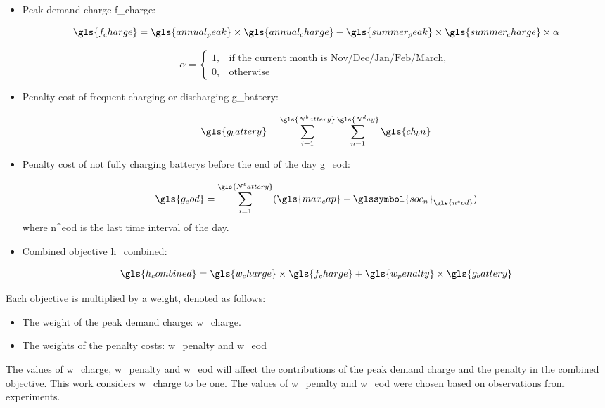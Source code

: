 \begin{itemize}
	\item Peak demand charge \gls{f_charge}: 
	
	\begin{equation}
		\gls{f_charge} =  \gls{annual_peak} \times \gls{annual_charge} + \gls{summer_peak} \times \gls{summer_charge} \times \alpha
	\end{equation}
	
	\begin{equation}
		\alpha = 
		\begin{cases}
			1,				& \text{if the current month is Nov/Dec/Jan/Feb/March, } \\
			0,              & \text{otherwise}
		\end{cases}
	\end{equation}
	
	
	\item Penalty cost of frequent charging or discharging \gls{g_battery}:
	
	\begin{equation}
		\gls{g_battery} = \sum_{i=1}^{\gls{N^battery}}\sum_{n=1}^{\gls{N^day}} \gls{ch_bn} 
	\end{equation}
	
	\item Penalty cost of not fully charging \glspl{battery} before the end of the day \gls{g_eod}:
	
	\begin{equation}
		\gls{g_eod} = \sum_{i=1}^{\gls{N^battery}} ( \gls{max_cap} -  \glssymbol{soc_n}_{ \gls{n^eod}  })
	\end{equation}
	where  \gls{n^eod} is the last time interval of the day. 
	
	\item Combined objective \gls{h_combined}:
	
	\begin{equation}
		\gls{h_combined} = \gls{w_charge} \times \gls{f_charge} + \gls{w_penalty} \times \gls{g_battery}
	\end{equation}
	
\end{itemize}

Each objective is multiplied by a weight, denoted as follows:

\begin{itemize}
	\item The weight of the peak demand charge: \gls{w_charge}.
	
	\item The weights of the penalty costs: \gls{w_penalty} and \gls{w_eod}
\end{itemize}
The values of \gls{w_charge}, \gls{w_penalty} and \gls{w_eod} will affect the contributions of the peak demand charge and the penalty in the combined objective. This work considers \gls{w_charge} to be one. The values of \gls{w_penalty} and \gls{w_eod} were chosen based on observations from experiments. 



